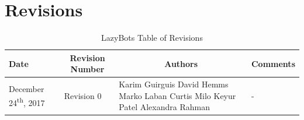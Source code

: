 \documentclass [10pt]{article}
\begin{document}

\pagebreak


\tableofcontents
\listoftables
\listoffigures



\pagebreak


\thispagestyle{empty}
\section{Revisions}
\begin{longtable}{| p{ } | p{ } | p{ } | p{ } |} \caption{LazyBots Table of Revisions}  \\

\hline 
\centering \textbf{Date} & 
\multicolumn{1}{c}{\textbf {Revision Number}} &
\multicolumn{1}{|c}{\textbf {Authors}} & 
\multicolumn{1}{|c|}{\textbf {Comments}} \\ \hline

\multirow{4}{*}{\centering December 24\textsuperscript{th}, 2017}  & 
\multirow{4}{*}{Revision 0}& 
		{Karim Guirguis \newline
		David Hemms \newline
		Marko Laban \newline
		Curtis Milo \newline
		Keyur Patel \newline
		Alexandra Rahman}
 &
 
\multirow{4}{*}{-} \\ 
\hline 

\end{longtable}



\pagebreak

\end{document}
